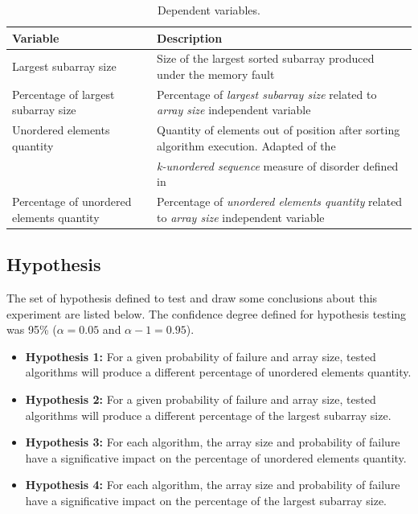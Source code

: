 \begin{table}[H]
    \caption{Dependent variables.}
    \begin{center}
    \begin{tabular}{|l|l|}
    \hline
    \textbf{Variable} & \textbf{Description} \\
    \hline
    Largest subarray size & Size of the largest sorted subarray produced under the memory fault \\
    \hline
    Percentage of largest subarray size & Percentage of \textit{largest subarray size} related to \textit{array size} independent variable \\
    \hline
    Unordered elements quantity & Quantity of elements out of position after sorting algorithm execution. Adapted of the \\ & \textit{k-unordered sequence} measure of disorder defined in \cite{Ferraro-Petrillo2009} \\
    \hline
    Percentage of unordered elements quantity & Percentage of \textit{unordered elements quantity} related to \textit{array size} independent variable \\
    \hline
    \end{tabular}
    \label{table-dependent-variables}
    \end{center}
\end{table}

\subsection{Hypothesis}

The set of hypothesis defined to test and draw some conclusions about this experiment are listed below. The confidence degree defined for hypothesis testing was 95\% ($\alpha = 0.05$ and $\alpha - 1 = 0.95$).

\begin{itemize}
    \item \textbf{Hypothesis 1:} For a given probability of failure and array size, tested algorithms will produce a different percentage of unordered elements quantity.
    \item \textbf{Hypothesis 2:} For a given probability of failure and array size, tested algorithms will produce a different percentage of the largest subarray size.
    \item \textbf{Hypothesis 3:} For each algorithm, the array size and probability of failure have a significative impact on the percentage of unordered elements quantity.
    \item \textbf{Hypothesis 4:} For each algorithm, the array size and probability of failure have a significative impact on the percentage of the largest subarray size.
\end{itemize}

